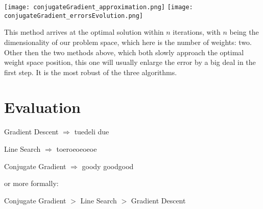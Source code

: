 \documentclass[a4paper,headings=small]{scrartcl}
\numberwithin{equation}{section} %
\numberwithin{figure}{section}   %
\begin{document}
\texttt{[image: conjugateGradient\_approximation.png]}
\texttt{[image: conjugateGradient\_errorsEvolution.png]}

This method arrives at the optimal solution within $n$ iterations,
with $n$ being the dimensionality of our problem space,
which here is the number of weights: two.
Other then the two methods above, which both slowly approach the optimal
weight space position, this one will usually enlarge the error by a big deal
in the first step.
It is the most robust of the three algorithms.


\newpage
\section{Evaluation}

\begin{list}{}{}
	\item Gradient Descent $\Rightarrow$ tuedeli due
	\item Line Search $\Rightarrow$ toeroeoeoeoe
	\item Conjugate Gradient $\Rightarrow$ goody goodgood
\end{list}


or more formally:

Conjugate Gradient $>$ Line Search $>$ Gradient Descent
\end{document}
